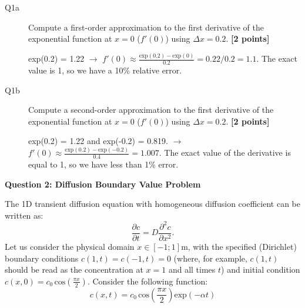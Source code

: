 \documentclass{article}
\newcommand{\ans}[1]{\textcolor{dark-green}{#1}}
\begin{document}
\begin{description}
\item [Q1a] Compute a first-order approximation to the first derivative of the exponential function at $x = 0$ ($f'(0)$) using $\Delta x  = 0.2$.  \textbf{[2 points]}

\ans{exp(0.2) = 1.22 $\rightarrow$ $f'(0) \approx \frac{\textrm{exp}(0.2)-\textrm{exp}(0)}{0.2} = 0.22/0.2 = 1.1$. The exact value is 1, so we have a 10\% relative error.}

\item [Q1b] Compute a second-order approximation to the first derivative of the exponential function at $x = 0$ ($f'(0)$) using $\Delta x  = 0.2$.  \textbf{[2 points]}

\ans{exp(0.2) = 1.22 and exp(-0.2) = 0.819. $\rightarrow$ $f'(0) \approx \frac{\textrm{exp}(0.2)-\textrm{exp}(-0.2)}{0.4} = 1.007$. The exact value of the derivative is equal to 1, so we have less than 1\% error.}

\end{description}




\textbf{Question 2: Diffusion Boundary Value Problem}

The 1D transient diffusion equation with homogeneous diffusion coefficient can be written as:
\begin{equation}
\frac{\partial c}{\partial t} = D \frac{\partial^2 c}{\partial x^2}. \label{eq:diff}
\end{equation} Let us consider the physical domain $ x \in \left[ -1 ; 1 \right] \mathrm{m}$, with the specified (Dirichlet) boundary conditions $c(1,t) = c(-1,t) = 0$ (where, for example, $c(1,t)$ should be read as the concentration at $x=1$ and all times $t$) and initial condition $c(x, 0) = c_0 \, \mathrm{cos}\left(\frac{\pi x}{2} \right)$. Consider the following function:
\begin{equation}
c(x,t) = c_0 \, \mathrm{cos}\left(\frac{\pi x}{2} \right) \mathrm{exp}\left(-\alpha t \right)  \label{eq:sol}
\end{equation}
\end{document}
